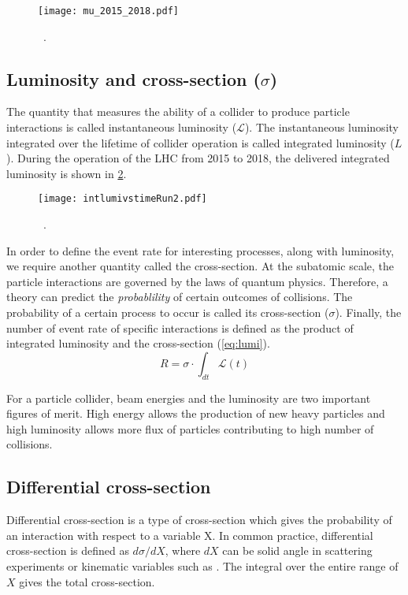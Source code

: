 \begin{figure}[htbp]
    \centering
    \texttt{[image: mu\_2015\_2018.pdf]}
    \caption{~\cite{twikipileup}.}%
    \label{fig:pileup}
\end{figure}

\subsection*{Luminosity and cross-section ($\sigma$)}
The quantity that measures the ability of a collider to produce particle interactions is called
instantaneous luminosity ($\mathcal{L}$). The instantaneous luminosity integrated over the lifetime
of collider operation is called integrated luminosity ($L$). During the operation of the LHC
from 2015 to 2018, the delivered integrated luminosity is shown in \cref{fig:lumi}.

\begin{figure}[htbp]
    \centering
    \texttt{[image: intlumivstimeRun2.pdf]}
    \caption{~\cite{twikilumi}.}%
    \label{fig:lumi}
\end{figure}

In order to define the event rate for interesting processes, along with luminosity, we require
another quantity called the cross-section. At the subatomic scale, the particle interactions 
are governed by the laws of quantum physics. Therefore, a theory can predict 
the \textit{probablility} of certain outcomes of collisions. The probability of a certain
process to occur is called its cross-section ($\sigma$). Finally, the number of event rate of
specific interactions is defined as the product of integrated luminosity and the cross-section (\cref{eq:lumi}).
\begin{equation}
    R = \sigma \cdot \int_{dt} \mathcal{L}(t)
    \label{eq:lumi}
\end{equation}

For a particle collider, beam energies and the luminosity are two important figures of merit. 
High energy allows the production of new heavy particles and high luminosity allows more flux 
of particles contributing to high number of collisions.

\subsection*{Differential cross-section}
Differential cross-section is a type of cross-section which gives the probability of an interaction
with respect to a variable X. In common practice, differential cross-section is defined as $d\sigma/dX$,
where $dX$ can be solid angle in scattering experiments or kinematic variables such as \pT. The 
integral over the entire range of $X$ gives the total cross-section. 

